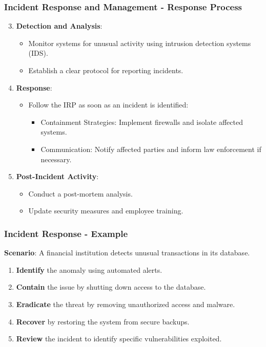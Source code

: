 \documentclass{beamer}
\begin{document}
\begin{frame}[fragile]
    \frametitle{Incident Response and Management - Response Process}
    \begin{enumerate}
        \setcounter{enumi}{2}  %
        \item \textbf{Detection and Analysis}:
        \begin{itemize}
            \item Monitor systems for unusual activity using intrusion detection systems (IDS).
            \item Establish a clear protocol for reporting incidents.
        \end{itemize}
        
        \item \textbf{Response}:
        \begin{itemize}
            \item Follow the IRP as soon as an incident is identified:
            \begin{itemize}
                \item Containment Strategies: Implement firewalls and isolate affected systems.
                \item Communication: Notify affected parties and inform law enforcement if necessary.
            \end{itemize}
        \end{itemize}
        
        \item \textbf{Post-Incident Activity}:
        \begin{itemize}
            \item Conduct a post-mortem analysis.
            \item Update security measures and employee training.
        \end{itemize}
    \end{enumerate}
\end{frame}

\begin{frame}[fragile]
    \frametitle{Incident Response - Example}
    \textbf{Scenario}: A financial institution detects unusual transactions in its database.
    \begin{enumerate}
        \item \textbf{Identify} the anomaly using automated alerts.
        \item \textbf{Contain} the issue by shutting down access to the database.
        \item \textbf{Eradicate} the threat by removing unauthorized access and malware.
        \item \textbf{Recover} by restoring the system from secure backups.
        \item \textbf{Review} the incident to identify specific vulnerabilities exploited.
    \end{enumerate}
\end{frame}
\end{document}
